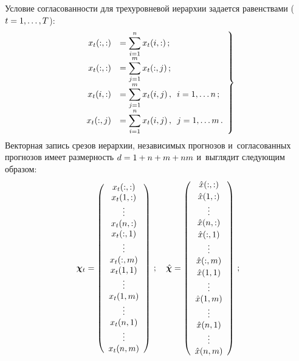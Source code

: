 \begin{multicols}{2}
Условие согласованности
для трехуровневой иерархии задается равенствами ($t \hm= 1, \ldots, T$):
\begin{equation}
\left.
\begin{array}{rl}
    x_t(:, :) &= \displaystyle\sum\limits_{i = 1}^n x_t(i, :)\,;\\[6pt]
    x_t(:, :) &= \displaystyle\sum\limits_{j = 1}^m x_t(:, j)\,;\\[6pt]
    x_t(i, :) &= \displaystyle\sum\limits_{j = 1}^m x_t(i, j)\,, \enskip i = 1, \ldots n\,;  \\[6pt]
    x_t(:, j) &= \displaystyle\sum\limits_{i = 1}^n x_t(i, j)\,, \enskip j = 1, \ldots m\,.
    \end{array}
    \right\}
    \label{eq:3LevelConstraint}
\end{equation}
Векторная запись срезов иерархии, независимых прогнозов и~согласованных
прогнозов имеет размерность $d \hm= 1 \hm+ n \hm+ m \hm+ nm$ и~выглядит
сле\-ду\-ющим образом:
$$
    \boldsymbol{\chi}_t = \left(%
        \begin{array}{c}
            x_t(:, :) \\
            x_t(1, :) \\
            \vdots \\
            x_t(n, :) \\
            x_t(:, 1) \\
            \vdots \\
            x_t(:, m) \\
            x_t(1, 1) \\
            \vdots \\
            x_t(1, m) \\
            \vdots \\
            x_t(n, 1) \\
            \vdots \\
            x_t(n, m) \\
        \end{array}%
        \right)\,; \quad
    \hchi = \left(%
        \begin{array}{c}
            \hx(:, :) \\[2pt]
            \hx(1, :) \\
            \vdots \\
            \hx(n, :) \\[2pt]
            \hx(:, 1) \\
            \vdots \\
            \hx(:, m) \\[2pt]
            \hx(1, 1) \\
            \vdots \\
            \hx(1, m) \\
            \vdots \\
            \hx(n, 1) \\
            \vdots \\
            \hx(n, m) \\
        \end{array}%
        \right)\,;
        $$


\end{multicols}

